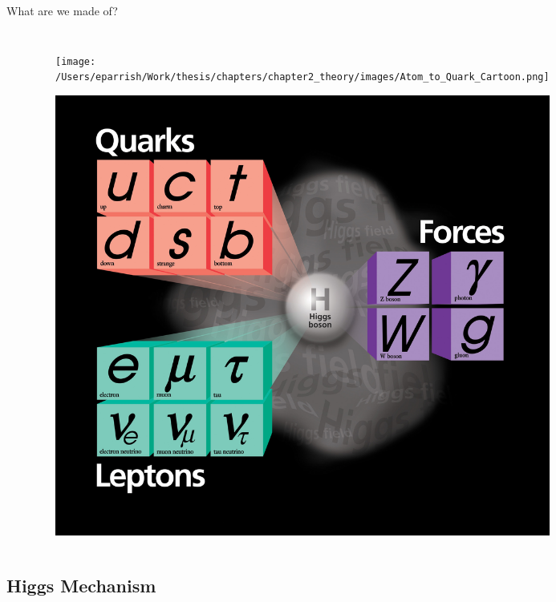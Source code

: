 \documentclass[aspectratio=169,xcolor=table]{beamer}
\begin{document}
\begin{frame}[t]{What are we made of?}
\begin{columns}
\begin{itemize}
      \end{itemize}
      \begin{figure}
        \centering
        \texttt{[image: /Users/eparrish/Work/thesis/chapters/chapter2\_theory/images/Atom\_to\_Quark\_Cartoon.png]}
        \caption{\tiny\cite{atom-to-quark} \cite{SM-Diagram}}
        \includegraphics[height=.4\textheight,keepaspectratio=true]{SM High Res.jpeg}
      \end{figure}
    \end{columns}
  \end{frame}

  \subsection{Higgs Mechanism}
\end{document}
